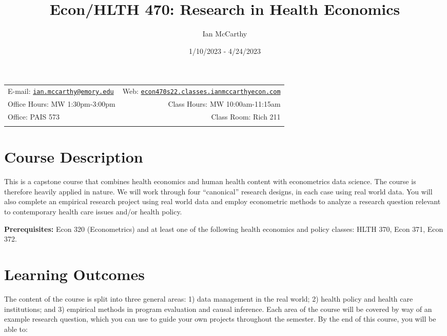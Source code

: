 \documentclass[11pt,]{article}
\title{Econ/HLTH 470: Research in Health Economics}
\author{Ian McCarthy}
\date{1/10/2023 - 4/24/2023}
\begin{document}
  

		\maketitle
		
	
		\thispagestyle{firststyle}



	\noindent \begin{tabular*}{\textwidth}{ @{\extracolsep{\fill}} lr @{\extracolsep{\fill}}}


E-mail: \texttt{\href{mailto:ian.mccarthy@emory.edu}{\nolinkurl{ian.mccarthy@emory.edu}}} & Web: \href{http://econ470s22.classes.ianmccarthyecon.com}{\tt econ470s22.classes.ianmccarthyecon.com}\\
Office Hours: MW 1:30pm-3:00pm  &  Class Hours: MW 10:00am-11:15am\\
Office: PAIS 573  & Class Room: Rich 211\\
	&  \\
	\hline
	\end{tabular*}
	
\vspace{2mm}
	


\hypertarget{course-description}{%
\section{Course Description}\label{course-description}}

This is a capstone course that combines health economics and human
health content with econometrics data science. The course is therefore
heavily applied in nature. We will work through four ``canonical''
research designs, in each case using real world data. You will also
complete an empirical research project using real world data and employ
econometric methods to analyze a research question relevant to
contemporary health care issues and/or health policy.

\textbf{Prerequisites:} Econ 320 (Econometrics) and at least one of the
following health economics and policy classes: HLTH 370, Econ 371, Econ
372.

\hypertarget{learning-outcomes}{%
\section{Learning Outcomes}\label{learning-outcomes}}

The content of the course is split into three general areas: 1) data
management in the real world; 2) health policy and health care
institutions; and 3) empirical methods in program evaluation and causal
inference. Each area of the course will be covered by way of an example
research question, which you can use to guide your own projects
throughout the semester. By the end of this course, you will be able to:
\end{document}
